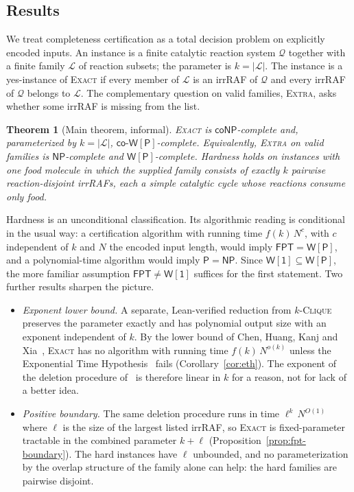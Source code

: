 \documentclass[11pt,a4paper]{article}
\theoremstyle{plain}
\newtheorem{theorem}{Theorem}[section]
\theoremstyle{definition}
\theoremstyle{remark}
\newcommand{\Exact}{\textup{\textsc{Exact}}}
\newcommand{\Extra}{\textup{\textsc{Extra}}}
\newcommand{\Clique}{\textup{\textsc{Clique}}}
\newcommand{\NP}{\mathsf{NP}}
\newcommand{\coNP}{\mathsf{coNP}}
\newcommand{\Ptime}{\mathsf{P}}
\newcommand{\FPT}{\mathsf{FPT}}
\newcommand{\WP}{\mathsf{W[P]}}
\newcommand{\coWP}{\mathsf{co\text{-}W[P]}}
\newcommand{\Wone}{\mathsf{W[1]}}
\newcommand{\cL}{\mathcal{L}}
\newcommand{\cQ}{\mathcal{Q}}
\newcommand{\Nlen}{N}
\begin{document}
\subsection*{Results}

We treat completeness certification as a total decision problem on explicitly encoded inputs. An instance is a finite catalytic reaction system $\cQ$ together with a finite family $\cL$ of reaction subsets; the parameter is $k=|\cL|$. The instance is a yes-instance of \Exact{} if every member of $\cL$ is an irrRAF of $\cQ$ and every irrRAF of $\cQ$ belongs to $\cL$. The complementary question on valid families, \Extra, asks whether some irrRAF is missing from the list.

\begin{theorem}[Main theorem, informal]\label{thm:main-intro}
\Exact{} is $\coNP$-complete and, parameterized by $k=|\cL|$, $\coWP$-complete. Equivalently, \Extra{} on valid families is $\NP$-complete and $\WP$-complete. Hardness holds on instances with one food molecule in which the supplied family consists of exactly $k$ pairwise reaction-disjoint irrRAFs, each a simple catalytic cycle whose reactions consume only food.
\end{theorem}

Hardness is an unconditional classification. Its algorithmic reading is conditional in the usual way: a certification algorithm with running time $f(k)\,\Nlen^{c}$, with $c$ independent of $k$ and $\Nlen$ the encoded input length, would imply $\FPT=\WP$, and a polynomial-time algorithm would imply $\Ptime=\NP$. Since $\Wone\subseteq\WP$, the more familiar assumption $\FPT\neq\Wone$ suffices for the first statement. Two further results sharpen the picture.

\begin{itemize}
\item \emph{Exponent lower bound.} A separate, Lean-verified reduction from $k$-\Clique{} preserves the parameter exactly and has polynomial output size with an exponent independent of $k$. By the lower bound of Chen, Huang, Kanj and Xia~\cite{chen2006strong}, \Exact{} has no algorithm with running time $f(k)\,\Nlen^{o(k)}$ unless the Exponential Time Hypothesis~\cite{impagliazzo2001eth} fails (Corollary~\ref{cor:eth}). The exponent of the deletion procedure of~\cite{steel2013minimal} is therefore linear in $k$ for a reason, not for lack of a better idea.
\item \emph{Positive boundary.} The same deletion procedure runs in time $\ell^{k}\,\Nlen^{O(1)}$ where $\ell$ is the size of the largest listed irrRAF, so \Exact{} is fixed-parameter tractable in the combined parameter $k+\ell$ (Proposition~\ref{prop:fpt-boundary}). The hard instances have $\ell$ unbounded, and no parameterization by the overlap structure of the family alone can help: the hard families are pairwise disjoint.
\end{itemize}
\end{document}
